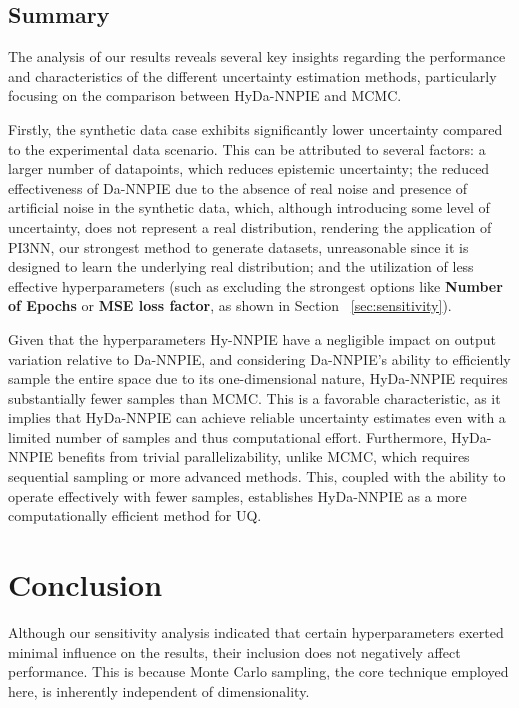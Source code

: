 \subsection{Summary}
The analysis of our results reveals several key insights regarding the performance and characteristics of the different uncertainty estimation methods, particularly focusing on the comparison between HyDa-NNPIE and MCMC.

Firstly, the synthetic data case exhibits significantly lower uncertainty compared to the experimental data scenario. This can be attributed to several factors: a larger number of datapoints, which reduces epistemic uncertainty; the reduced effectiveness of Da-NNPIE due to the absence of real noise and presence of artificial noise in the synthetic data, which, although introducing some level of uncertainty, does not represent a real distribution, rendering the application of PI3NN, our strongest method to generate datasets, unreasonable since it is designed to learn the underlying real distribution; and the utilization of less effective hyperparameters (such as excluding the strongest options like \textbf{Number of Epochs} or \textbf{MSE loss factor}, as shown in Section ~\vref{sec:sensitivity}).

Given that the hyperparameters Hy-NNPIE have a negligible impact on output variation relative to Da-NNPIE, and considering Da-NNPIE's ability to efficiently sample the entire space due to its one-dimensional nature, HyDa-NNPIE requires substantially fewer samples than MCMC. This is a favorable characteristic, as it implies that HyDa-NNPIE can achieve reliable uncertainty estimates even with a limited number of samples and thus computational effort. Furthermore, HyDa-NNPIE benefits from trivial parallelizability, unlike MCMC, which requires sequential sampling or more advanced methods. This, coupled with the ability to operate effectively with fewer samples, establishes HyDa-NNPIE as a more computationally efficient method for UQ.










\section{Conclusion}
Although our sensitivity analysis indicated that certain hyperparameters exerted minimal influence on the results, their inclusion does not negatively affect performance. This is because Monte Carlo sampling, the core technique employed here, is inherently independent of dimensionality.

